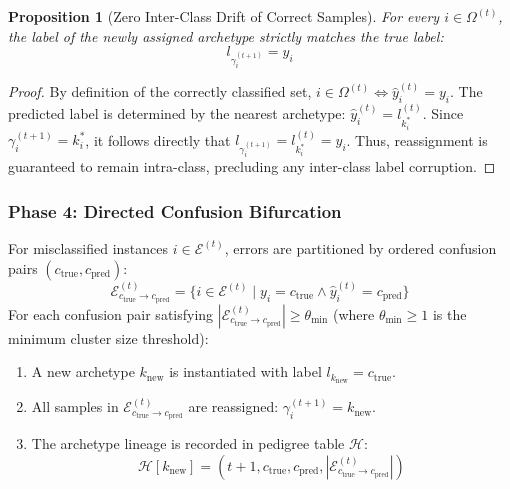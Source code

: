 \documentclass[11pt,a4paper]{article}
\newtheorem{proposition}{Proposition}
\begin{document}
\begin{proposition}[Zero Inter-Class Drift of Correct Samples]
\label{prop:no_drift}
For every $i \in \Omega^{(t)}$, the label of the newly assigned archetype strictly matches the true label:
\begin{equation}
    l_{\gamma_i^{(t+1)}} = y_i
\end{equation}
\end{proposition}
\begin{proof}
By definition of the correctly classified set, $i \in \Omega^{(t)} \iff \hat{y}_i^{(t)} = y_i$. The predicted label is determined by the nearest archetype: $\hat{y}_i^{(t)} = l_{k_i^*}^{(t)}$. Since $\gamma_i^{(t+1)} = k_i^*$, it follows directly that $l_{\gamma_i^{(t+1)}} = l_{k_i^*}^{(t)} = y_i$. Thus, reassignment is guaranteed to remain intra-class, precluding any inter-class label corruption.
\end{proof}

\subsubsection{Phase 4: Directed Confusion Bifurcation}
For misclassified instances $i \in \mathcal{E}^{(t)}$, errors are partitioned by ordered confusion pairs $(c_{\text{true}}, c_{\text{pred}})$:
\begin{equation}
    \mathcal{E}_{c_{\text{true}} \to c_{\text{pred}}}^{(t)} = \{i \in \mathcal{E}^{(t)} \mid y_i = c_{\text{true}} \wedge \hat{y}_i^{(t)} = c_{\text{pred}}\}
\end{equation}
For each confusion pair satisfying $|\mathcal{E}_{c_{\text{true}} \to c_{\text{pred}}}^{(t)}| \ge \theta_{\text{min}}$ (where $\theta_{\text{min}} \ge 1$ is the minimum cluster size threshold):
\begin{enumerate}
    \item A new archetype $k_{\text{new}}$ is instantiated with label $l_{k_{\text{new}}} = c_{\text{true}}$.
    \item All samples in $\mathcal{E}_{c_{\text{true}} \to c_{\text{pred}}}^{(t)}$ are reassigned: $\gamma_i^{(t+1)} = k_{\text{new}}$.
    \item The archetype lineage is recorded in pedigree table $\mathcal{H}$:
    \begin{equation}
        \mathcal{H}[k_{\text{new}}] = \left(t+1, c_{\text{true}}, c_{\text{pred}}, |\mathcal{E}_{c_{\text{true}} \to c_{\text{pred}}}^{(t)}|\right)
    \end{equation}
\end{enumerate}
\end{document}
